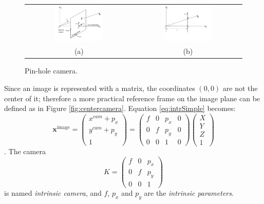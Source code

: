 \begin{figure}[t]
 \begin{tabular}{cc}
  \includegraphics[width=0.48\textwidth]{./img/ch-camera/camera}&
  \includegraphics[width=0.48\textwidth]{./img/ch-camera/camera01}\\
  (a)&(b)
 \end{tabular}
 \caption{Pin-hole camera.}
 \label{fig:pinhole}
\end{figure}
Since an image is represented with a matrix, the coordinates $(0,0)$ are not the center of it; therefore a more practical reference frame on the image plane can be defined as in Figure \ref{fig:centercamera}. Equation \eqref{eq:intrSimple} becomes:
\begin{equation}
\label{eq:intrCompl}
 \mathbf{x}^{\text{image}} = 
 \begin{pmatrix}
 x^{cam} + p_x\\
 y^{cam} + p_y\\
 1
 \end{pmatrix} =
 \begin{pmatrix}
 f&0&p_x&0\\
 0&f&p_y&0\\
 0&0&1&0
 \end{pmatrix} 
 \begin{pmatrix}
 X\\
 Y\\
 Z\\
 1
 \end{pmatrix}
\end{equation}.
The camera 
\begin{equation}
\label{eq:kmatr}
K = 
\begin{pmatrix}
 f&0&p_x\\
 0&f&p_y\\
 0&0&1
 \end{pmatrix} 
\end{equation}
is named \emph{intrinsic camera}, and $f$, $p_x$ and $p_y$ are the \emph{intrinsic parameters}. 

